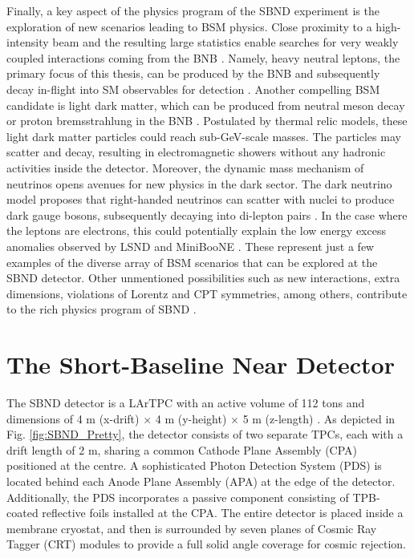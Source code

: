 Finally, a key aspect of the physics program of the SBND experiment is the exploration of new scenarios leading to BSM physics. 
Close proximity to a high-intensity beam and the resulting large statistics enable searches for very weakly coupled interactions coming from the BNB \cite{SBNProgram}.
Namely, heavy neutral leptons, the primary focus of this thesis, can be produced by the BNB and subsequently decay in-flight into SM observables for detection \cite{SBNHNL}.
Another compelling BSM candidate is light dark matter, which can be produced from neutral meson decay or proton bremsstrahlung in the BNB \cite{LightDarkMatter}. 
Postulated by thermal relic models, these light dark matter particles could reach sub-GeV-scale masses. 
The particles may scatter and decay, resulting in electromagnetic showers without any hadronic activities inside the detector.
Moreover, the dynamic mass mechanism of neutrinos opens avenues for new physics in the dark sector. 
The dark neutrino model proposes that right-handed neutrinos can scatter with nuclei to produce dark gauge bosons, subsequently decaying into di-lepton pairs \cite{DarkNeutrino}. 
In the case where the leptons are electrons, this could potentially explain the low energy excess anomalies observed by LSND and MiniBooNE \cite{DarkNeutrinoLEE}.
These represent just a few examples of the diverse array of BSM scenarios that can be explored at the SBND detector. 
Other unmentioned possibilities such as new interactions, extra dimensions, violations of Lorentz and CPT symmetries, among others, contribute to the rich physics program of SBND \cite{SBNProgram}.

\section{The Short-Baseline Near Detector}
\label{sec4SBND}

The SBND detector is a LArTPC with an active volume of 112 tons and dimensions of 4 m (x-drift) $\times$ 4 m (y-height) $\times$ 5 m (z-length) \cite{SBNProposal}.
As depicted in Fig. \ref{fig:SBND_Pretty}, the detector consists of two separate TPCs, each with a drift length of 2 m, sharing a common Cathode Plane Assembly (CPA) positioned at the centre.
A sophisticated Photon Detection System (PDS) is located behind each Anode Plane Assembly (APA) at the edge of the detector.
Additionally, the PDS incorporates a passive component consisting of TPB-coated reflective foils installed at the CPA.
The entire detector is placed inside a membrane cryostat, and then is surrounded by seven planes of Cosmic Ray Tagger (CRT) modules to provide a full solid angle coverage for cosmic rejection.

